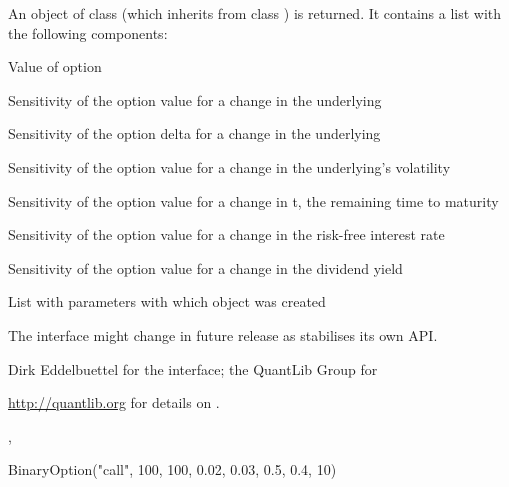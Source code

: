 \begin{Value}
An object of class  (which inherits from class
) is returned. It contains a list with the
following components: 
\begin{ldescription}
\item[\code{value}] Value of option
\item[\code{delta}] Sensitivity of the option value for a change in the underlying
\item[\code{gamma}] Sensitivity of the option delta for a change in the underlying
\item[\code{vega}] Sensitivity of the option value for a change in the
underlying's volatility
\item[\code{theta}] Sensitivity of the option value for a change in t, the
remaining time to maturity
\item[\code{rho}] Sensitivity of the option value for a change in the
risk-free interest rate
\item[\code{dividendRho}] Sensitivity of the option value for a change in the
dividend yield
\item[\code{parameters}] List with parameters with which object was created
\end{ldescription}
\end{Value}
\begin{Note}\relax
The interface might change in future release as 
stabilises its own API.
\end{Note}
\begin{Author}\relax
Dirk Eddelbuettel  for the \R{} interface;
the QuantLib Group for 
\end{Author}
\begin{References}\relax
\url{http://quantlib.org} for details on .
\end{References}
\begin{SeeAlso}\relax
{},
\end{SeeAlso}
\begin{Examples}
\begin{ExampleCode}
BinaryOption("call", 100, 100, 0.02, 0.03, 0.5, 0.4, 10)
\end{ExampleCode}
\end{Examples}

